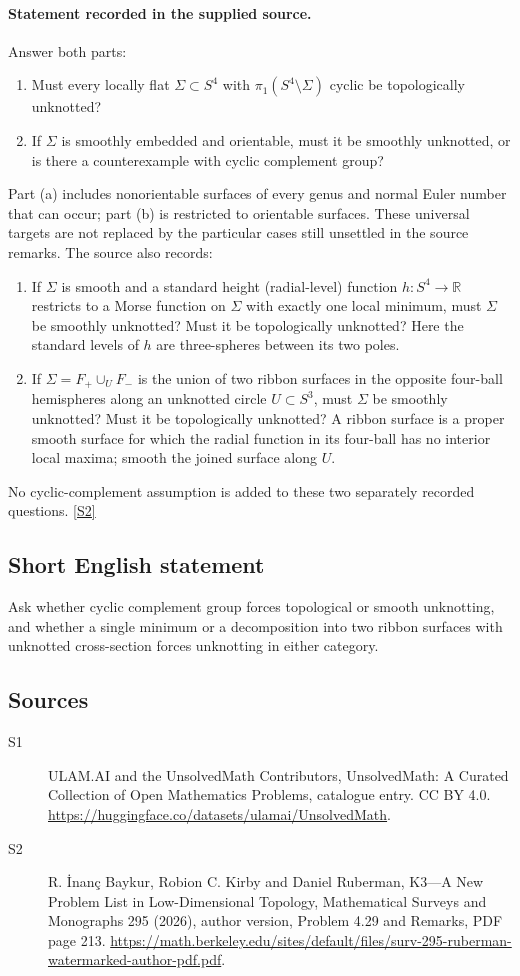 \documentclass[11pt]{article}
\newcommand{\sref}[2]{\hyperlink{source:#1:#2}{[S#2]}}
\begin{document}
\paragraph{Statement recorded in the supplied source.}
Answer both parts:
\begin{enumerate}
\item[(a)] Must every locally flat $\Sigma\subset S^4$ with $\pi_1(S^4\setminus\Sigma)$ cyclic be topologically unknotted?
\item[(b)] If $\Sigma$ is smoothly embedded and orientable, must it be smoothly unknotted, or is there a counterexample with cyclic complement group?
\end{enumerate}
Part (a) includes nonorientable surfaces of every genus and normal Euler number that can occur; part (b) is restricted to orientable surfaces. These universal targets are not replaced by the particular cases still unsettled in the source remarks. The source also records:
\begin{enumerate}
\item[(i)] If $\Sigma$ is smooth and a standard height (radial-level) function $h:S^4\to\mathbb R$ restricts to a Morse function on $\Sigma$ with exactly one local minimum, must $\Sigma$ be smoothly unknotted? Must it be topologically unknotted? Here the standard levels of $h$ are three-spheres between its two poles.
\item[(ii)] If $\Sigma=F_+\cup_U F_-$ is the union of two ribbon surfaces in the opposite four-ball hemispheres along an unknotted circle $U\subset S^3$, must $\Sigma$ be smoothly unknotted? Must it be topologically unknotted? A ribbon surface is a proper smooth surface for which the radial function in its four-ball has no interior local maxima; smooth the joined surface along $U$.
\end{enumerate}
No cyclic-complement assumption is added to these two separately recorded questions. \sref{statement}{2}
\subsection{Short English statement}
Ask whether cyclic complement group forces topological or smooth unknotting, and whether a single minimum or a decomposition into two ribbon surfaces with unknotted cross-section forces unknotting in either category.
\subsection{Sources}
\begin{description}
\item[\hypertarget{source:statement:1}{S1}] ULAM.AI and the UnsolvedMath Contributors, UnsolvedMath: A Curated Collection of Open Mathematics Problems, catalogue entry. CC BY 4.0. \url{https://huggingface.co/datasets/ulamai/UnsolvedMath}.
\item[\hypertarget{source:statement:2}{S2}] R. İnanç Baykur, Robion C. Kirby and Daniel Ruberman, K3—A New Problem List in Low-Dimensional Topology, Mathematical Surveys and Monographs 295 (2026), author version, Problem 4.29 and Remarks, PDF page 213. \url{https://math.berkeley.edu/sites/default/files/surv-295-ruberman-watermarked-author-pdf.pdf}.
\end{description}
\label{end:statement}
\end{document}
